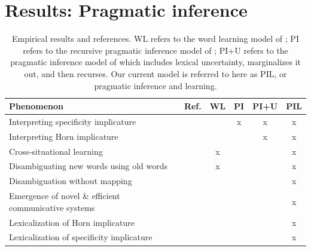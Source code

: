 \documentclass{article} %
\newcommand{\word}{\text{word}}
\newcommand{\obj}{\text{object}}
\newcommand{\lex}{\text{lexicon}}
\begin{document}
%
%
%
%
%

\section{Results: Pragmatic inference}


\begin{table}[t]
\label{tab:results}
\begin{center}
\begin{tabular}{lccccc}
\toprule
Phenomenon & Ref. & WL & PI & PI+U & PIL \\
\midrule
Interpreting specificity implicature & \cite{grice1975} &  & x &x & x\\
Interpreting Horn implicature & \cite{horn1984} & &  & x& x\\
Cross-situational learning & \cite{smith2008} & x& & & x \\
Disambiguating new words using old words & \cite{markman1988} &x  & & & x \\
Disambiguation without mapping & \cite{horst2008} &  & & & x \\
Emergence of novel \& efficient communicative systems & \cite{galantucci2005} & & & & x \\
Lexicalization of Horn implicature & \cite{horn1984} & & & & x \\
Lexicalization of specificity implicature & \cite{levinson2000} & & & & x \\
\hline
\end{tabular}
\end{center}
\caption{Empirical results and references. WL refers to the word learning model of \cite{frank2009}; PI refers to the recursive pragmatic inference model of \cite{frank2012}; PI+U refers to the pragmatic inference model of \cite{bergen2012} which includes lexical uncertainty, marginalizes it out, and then recurses. Our current model is referred to here as PIL, or pragmatic inference and learning.}
\end{table}
\end{document}
